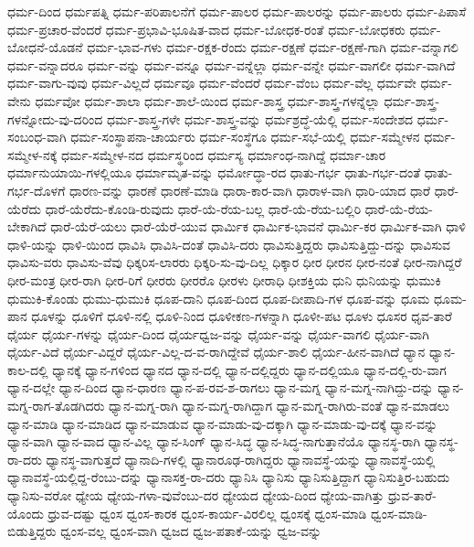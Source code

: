 {ಧರ್ಮ-ದಿಂದ
ಧರ್ಮಪತ್ನಿ
ಧರ್ಮ-ಪರಿಪಾಲನೆಗೆ
ಧರ್ಮ-ಪಾಲರ
ಧರ್ಮ-ಪಾಲರನ್ನು
ಧರ್ಮ-ಪಾಲರು
ಧರ್ಮ-ಪಿಪಾಸೆ
ಧರ್ಮ-ಪ್ರಚಾರ-ವೆಂದರೆ
ಧರ್ಮ-ಪ್ರಭಾವಿ-ಭೂಷಿತ-ವಾದ
ಧರ್ಮ-ಬೋಧಕ-ರಂತೆ
ಧರ್ಮ-ಬೋಧಕರು
ಧರ್ಮ-ಬೋಧನೆ-ಯೊಡನೆ
ಧರ್ಮ-ಭಾವ-ಗಳು
ಧರ್ಮ-ರಕ್ಷಕ-ರೆಂದು
ಧರ್ಮ-ರಕ್ಷಣೆ
ಧರ್ಮ-ರಕ್ಷಣೆ-ಗಾಗಿ
ಧರ್ಮ-ವನ್ನಾಗಲಿ
ಧರ್ಮ-ವನ್ನಾದರೂ
ಧರ್ಮ-ವನ್ನು
ಧರ್ಮ-ವನ್ನೂ
ಧರ್ಮ-ವನ್ನೆಲ್ಲಾ
ಧರ್ಮ-ವನ್ನೇ
ಧರ್ಮ-ವಾಗಲೀ
ಧರ್ಮ-ವಾಗಿದೆ
ಧರ್ಮ-ವಾಗು-ವುವು
ಧರ್ಮ-ವಿಲ್ಲದೆ
ಧರ್ಮವೂ
ಧರ್ಮ-ವೆಂದರೆ
ಧರ್ಮ-ವೆಂಬ
ಧರ್ಮ-ವೆಲ್ಲ
ಧರ್ಮವೇ
ಧರ್ಮ-ವೇನು
ಧರ್ಮವೋ
ಧರ್ಮ-ಶಾಲಾ
ಧರ್ಮ-ಶಾಲೆ-ಯಿಂದ
ಧರ್ಮ-ಶಾಸ್ತ್ರ
ಧರ್ಮ-ಶಾಸ್ತ್ರ-ಗಳನ್ನೆಲ್ಲಾ
ಧರ್ಮ-ಶಾಸ್ತ್ರ-ಗಳನ್ನೋದು-ವು-ದರಿಂದ
ಧರ್ಮ-ಶಾಸ್ತ್ರ-ಗಳೇ
ಧರ್ಮ-ಶಾಸ್ತ್ರ-ವನ್ನು
ಧರ್ಮಶ್ರದ್ಧೆ-ಯೆಲ್ಲಿ
ಧರ್ಮ-ಸಂದೇಶದ
ಧರ್ಮ-ಸಂಬಂಧ-ವಾಗಿ
ಧರ್ಮ-ಸಂಸ್ಥಾಪನಾ-ಚಾರ್ಯರು
ಧರ್ಮ-ಸಂಸ್ಥೆಗೂ
ಧರ್ಮ-ಸಭೆ-ಯಲ್ಲಿ
ಧರ್ಮ-ಸಮ್ಮೇಳನ
ಧರ್ಮ-ಸಮ್ಮೇಳ-ನಕ್ಕೆ
ಧರ್ಮ-ಸಮ್ಮೇಳ-ನದ
ಧರ್ಮಸ್ಥರಿಂದ
ಧರ್ಮಸ್ಯ
ಧರ್ಮಾಂಧ-ನಾಗಿದ್ದೆ
ಧರ್ಮಾ-ಚಾರ
ಧರ್ಮಾನುಯಾಯಿ-ಗಳಲ್ಲಿಯೂ
ಧರ್ಮಾಮೃತ-ವನ್ನು
ಧರ್ಮೋದ್ಧಾ-ರದ
ಧಾತು-ಗರ್ಭ
ಧಾತು-ಗರ್ಭ-ದಂತೆ
ಧಾತು-ಗರ್ಭ-ದೊಳಗೆ
ಧಾರಣ-ವನ್ನು
ಧಾರಣೆ
ಧಾರಣೆ-ಮಾಡಿ
ಧಾರಾ-ಕಾರ-ವಾಗಿ
ಧಾರಾಳ-ವಾಗಿ
ಧಾರಿ-ಯಾದ
ಧಾರೆ
ಧಾರೆ-ಯೆರೆದು
ಧಾರೆ-ಯೆರೆದು-ಕೊಂಡಿ-ರುವುದು
ಧಾರೆ-ಯೆ-ರೆಯ-ಬಲ್ಲ
ಧಾರೆ-ಯೆ-ರೆಯ-ಬಲ್ಲಿರಿ
ಧಾರೆ-ಯೆ-ರೆಯ-ಬೇಕಾಗಿದೆ
ಧಾರೆ-ಯೆರೆ-ಯಲು
ಧಾರೆ-ಯೆರೆ-ಯುವ
ಧಾರ್ಮಿಕ
ಧಾರ್ಮಿಕ-ಭಾವನೆ
ಧಾರ್ಮಿ-ಕರ
ಧಾರ್ಮಿಕ-ವಾಗಿ
ಧಾಳಿ
ಧಾಳಿ-ಯನ್ನು
ಧಾಳಿ-ಯಿಂದ
ಧಾವಿಸಿ
ಧಾವಿಸಿ-ದಂತೆ
ಧಾವಿಸಿ-ದರು
ಧಾವಿಸುತ್ತಿದ್ದರು
ಧಾವಿಸುತ್ತಿದ್ದು-ದನ್ನು
ಧಾವಿಸುವ
ಧಾವಿಸು-ವರು
ಧಾವಿಸು-ವೆವು
ಧಿಕ್ಕರಿಸ-ಲಾರರು
ಧಿಕ್ಕರಿ-ಸು-ವು-ದಿಲ್ಲ
ಧಿಕ್ಕಾರ
ಧೀರ
ಧೀರನ
ಧೀರ-ನಂತೆ
ಧೀರ-ನಾಗಿದ್ದರೆ
ಧೀರ-ಮಂತ್ರ
ಧೀರ-ರಾಗಿ
ಧೀರ-ರಿಗೆ
ಧೀರರು
ಧೀರರೊ
ಧೀರಳು
ಧೀರಾಧಿ
ಧೀಶಕ್ತಿಯ
ಧುನಿ
ಧುನಿಯನ್ನು
ಧುಮುಕಿ
ಧುಮುಕಿ-ಕೊಂಡು
ಧುಮು-ಧುಮುಕಿ
ಧೂಪ-ದಾನಿ
ಧೂಪ-ದಿಂದ
ಧೂಪ-ದೀಪಾದಿ-ಗಳ
ಧೂಪ-ವನ್ನು
ಧೂಮ
ಧೂಮ-ಪಾನ
ಧೂಳನ್ನು
ಧೂಳಿಗೆ
ಧೂಳಿ-ನಲ್ಲಿ
ಧೂಳಿ-ನಿಂದ
ಧೂಳೀಕಣ-ಗಳನ್ನಾಗಿ
ಧೂಳೀ-ಪಟ
ಧೂಳು
ಧೂಸರ
ಧೃವ-ತಾರೆ
ಧೈರ್ಯ
ಧೈರ್ಯ-ಗಳನ್ನು
ಧೈರ್ಯ-ದಿಂದ
ಧೈರ್ಯಧ್ವಜ-ವನ್ನು
ಧೈರ್ಯ-ವನ್ನು
ಧೈರ್ಯ-ವಾಗಲಿ
ಧೈರ್ಯ-ವಾಗಿ
ಧೈರ್ಯ-ವಿದೆ
ಧೈರ್ಯ-ವಿದ್ದರೆ
ಧೈರ್ಯ-ವಿಲ್ಲ-ದ-ವ-ರಾಗಿದ್ದೇವೆ
ಧೈರ್ಯ-ಶಾಲಿ
ಧೈರ್ಯ-ಹೀನ-ವಾಗಿದೆ
ಧ್ಯಾನ
ಧ್ಯಾನ-ಕಾಲ-ದಲ್ಲಿ
ಧ್ಯಾನಕ್ಕೆ
ಧ್ಯಾನ-ಗಳಿಂದ
ಧ್ಯಾನದ
ಧ್ಯಾನ-ದಲ್ಲಿ
ಧ್ಯಾನ-ದಲ್ಲಿದ್ದರು
ಧ್ಯಾನ-ದಲ್ಲಿಯೂ
ಧ್ಯಾನ-ದಲ್ಲಿ-ರು-ವಾಗ
ಧ್ಯಾನ-ದಲ್ಲೇ
ಧ್ಯಾನ-ದಿಂದ
ಧ್ಯಾನ-ಧಾರಣ
ಧ್ಯಾನ-ಪ-ರವ-ಶ-ರಾಗಲು
ಧ್ಯಾನ-ಮಗ್ನ
ಧ್ಯಾನ-ಮಗ್ನ-ನಾಗಿದ್ದು-ದನ್ನು
ಧ್ಯಾನ-ಮಗ್ನ-ರಾಗ-ತೊಡಗಿದರು
ಧ್ಯಾನ-ಮಗ್ನ-ರಾಗಿ
ಧ್ಯಾನ-ಮಗ್ನ-ರಾಗಿದ್ದಾಗ
ಧ್ಯಾನ-ಮಗ್ನ-ರಾಗಿರು-ವಂತೆ
ಧ್ಯಾನ-ಮಾಡಲು
ಧ್ಯಾನ-ಮಾಡಿ
ಧ್ಯಾನ-ಮಾಡಿದ
ಧ್ಯಾನ-ಮಾಡುವ
ಧ್ಯಾನ-ಮಾಡು-ವು-ದಕ್ಕಾಗಿ
ಧ್ಯಾನ-ಮಾಡು-ವು-ದಕ್ಕೆ
ಧ್ಯಾನ-ವನ್ನು
ಧ್ಯಾನ-ವಾಗಿ
ಧ್ಯಾನ-ವಾದ
ಧ್ಯಾನ-ವಿಲ್ಲ
ಧ್ಯಾನ-ಸಿಂಗ್
ಧ್ಯಾನ-ಸಿದ್ಧ
ಧ್ಯಾನ-ಸಿದ್ಧ-ನಾಗುತ್ತಾನೆಯೊ
ಧ್ಯಾನಸ್ಥ-ರಾಗಿ
ಧ್ಯಾನಸ್ಥ-ರಾ-ದರು
ಧ್ಯಾನಸ್ಥ-ವಾಗುತ್ತದೆ
ಧ್ಯಾನಾದಿ-ಗಳಲ್ಲಿ
ಧ್ಯಾನಾರೂಢ-ರಾಗಿದ್ದರು
ಧ್ಯಾನಾವಸ್ಥೆ-ಯನ್ನು
ಧ್ಯಾನಾವಸ್ಥೆ-ಯಲ್ಲಿ
ಧ್ಯಾನಾವಸ್ಥೆ-ಯಲ್ಲಿದ್ದ-ರೆಂಬು-ದನ್ನು
ಧ್ಯಾನಾಸಕ್ತ-ರಾ-ದರು
ಧ್ಯಾನಿಸಿ
ಧ್ಯಾನಿಸು
ಧ್ಯಾನಿಸುತ್ತಿದ್ದಾಗ
ಧ್ಯಾನಿಸುತ್ತಿರ-ಬಹುದು
ಧ್ಯಾನಿಸು-ವರೋ
ಧ್ಯೇಯ
ಧ್ಯೇಯ-ಗಳಾ-ವುವೆಂಬು-ದರ
ಧ್ಯೇಯದ
ಧ್ಯೇಯ-ದಿಂದ
ಧ್ಯೇಯ-ವಾಗಿತ್ತು
ಧ್ರುವ-ತಾರೆ-ಯೊಂದು
ಧ್ರುವ-ದಷ್ಟು
ಧ್ವಂಸ
ಧ್ವಂಸ-ಕಾರಕ
ಧ್ವಂಸ-ಕಾರ್ಯ-ವಿರಲಿಲ್ಲ
ಧ್ವಂಸಕ್ಕೆ
ಧ್ವಂಸ-ಮಾಡಿ
ಧ್ವಂಸ-ಮಾಡಿ-ಬಿಡುತ್ತಿದ್ದರು
ಧ್ವಂಸ-ವಲ್ಲ
ಧ್ವಂಸ-ವಾಗಿ
ಧ್ವಜದ
ಧ್ವಜ-ಪತಾಕೆ-ಯನ್ನು
ಧ್ವಜ-ವನ್ನು
}
